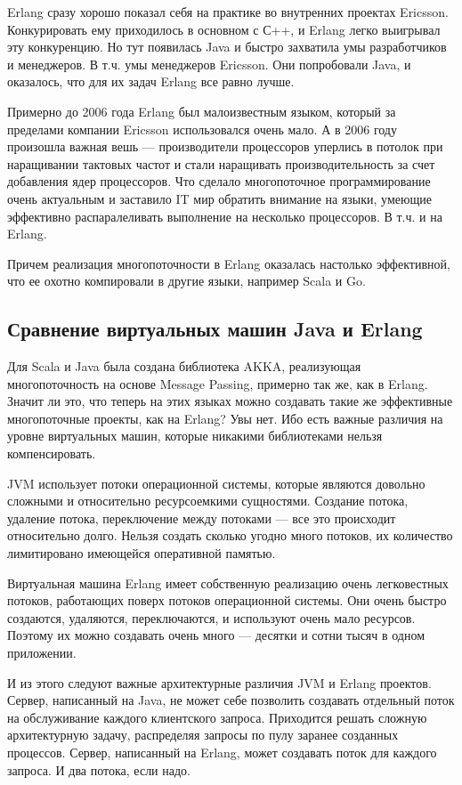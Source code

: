 \documentclass[10pt, a5paper]{article}
\begin{document}
Erlang сразу хорошо показал себя на практике во внутренних проектах Ericsson. Конкурировать ему приходилось в основном с С++, и Erlang легко выигрывал эту конкуренцию. Но тут появилась Java и быстро захватила умы разработчиков и менеджеров. В т.ч. умы менеджеров Ericsson. Они попробовали Java, и оказалось, что для их задач Erlang все равно лучше.

Примерно до 2006 года Erlang был малоизвестным языком, который за пределами компании Ericsson использовался очень мало. А в 2006 году произошла важная вешь --- производители процессоров уперлись в потолок при наращивании тактовых частот и стали наращивать производительность за счет добавления ядер процессоров. Что сделало многопоточное программирование очень актуальным и заставило IT мир обратить внимание на языки, умеющие эффективно распаралеливать выполнение на несколько процессоров. В т.ч. и на Erlang.

Причем реализация многопоточности в Erlang оказалась настолько эффективной, что ее охотно компировали в другие языки, например Scala и Go.

\subsection*{Сравнение виртуальных машин Java и Erlang}

Для Scala и Java была создана библиотека AKKA, реализующая многопоточность на основе Message Passing, примерно так же, как в Erlang. Значит ли это, что теперь на этих языках можно создавать такие же эффективные многопоточные проекты, как на Erlang? Увы нет. Ибо есть важные различия на уровне виртуальных машин, которые никакими библиотеками нельзя компенсировать.

JVM использует потоки операционной системы, которые являются довольно сложными и относительно ресурсоемкими сущностями. Создание потока, удаление потока, переключение между потоками --- все это происходит относительно долго. Нельзя создать сколько угодно много потоков, их количество лимитировано имеющейся оперативной памятью.

Виртуальная машина Erlang имеет собственную реализацию очень легковестных потоков, работающих поверх потоков операционной системы. Они очень быстро создаются, удаляются, переключаются, и используют очень мало ресурсов. Поэтому их можно создавать очень много --- десятки и сотни тысяч в одном приложении.

И из этого следуют важные архитектурные различия JVM и Erlang проектов. Сервер, написанный на Java, не может себе позволить создавать отдельный поток на обслуживание каждого клиентского запроса. Приходится решать сложную архитектурную задачу, распределяя запросы по пулу заранее созданных процессов. Сервер, написанный на Erlang, может создавать поток для каждого запроса. И два потока, если надо.
\end{document}
